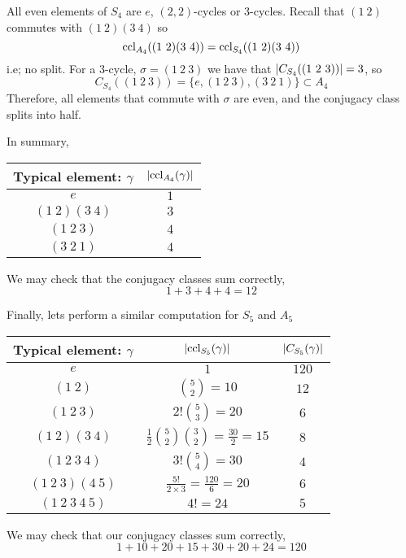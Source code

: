 \documentclass{article}
\begin{document}
\begin{eg}
    All even elements of $S_4$ are $e$, $(2, 2)$-cycles or $3$-cycles.
    Recall that $(1\ 2)$ commutes with $(1\ 2)(3\ 4)$ so
    \[
        \operatorname{ccl}_{A_4}((1\ 2)(3\ 4)) = \operatorname{ccl}_{S_4}((1\ 2)(3\ 4))  
    \]
    i.e; no split. For a $3$-cycle, $\sigma = (1\ 2\ 3)$ we have that $\left\lvert C_{S_4}((1\ 2\ 3))\right\rvert = 3$, so
    \[
        C_{S_4}((1\ 2\ 3)) = \{e, (1\ 2\ 3), (3\ 2\ 1)\} \subset A_4
    \]
    Therefore, all elements that commute with $\sigma$ are even, and the conjugacy class splits into half.

    In summary,
    \begin{center}
    \begin{tabular}{c | c}
        Typical element: $\gamma$ & $\left\lvert \operatorname{ccl}_{A_4}(\gamma)\right\rvert$ \\
        \hline
        $e$ & $1$ \\
        $(1\ 2)(3\ 4)$ & $3$ \\
        $(1\ 2\ 3)$ & $4$ \\
        $(3\ 2\ 1)$ & $4$
    \end{tabular}
    \end{center}
    We may check that the conjugacy classes sum correctly,
    \[
        1 + 3 + 4 + 4 = 12
    \]
\end{eg}

Finally, lets perform a similar computation for $S_5$ and $A_5$
\begin{eg}[Conjugacy in $S_5$]
    \begin{center}
    \begin{tabular}{c | c | c}
        Typical element: $\gamma$ & $\left\lvert \operatorname{ccl}_{S_5}(\gamma)\right\rvert$ & $\left\lvert C_{S_5}(\gamma)\right\rvert$ \\
        \hline
        $e$ & $1$ & $120$ \\[10pt]
        $(1\ 2)$ & $\binom{5}{2} = 10$ & $12$ \\[10pt]
        $(1\ 2\ 3)$ & $2! \binom{5}{3} = 20$ & $6$ \\[10pt]
        $(1\ 2)(3\ 4)$ & $\frac{1}{2} \binom{5}{2} \binom{3}{2} = \frac{30}{2} = 15$ & $8$ \\[10pt]
        $(1\ 2\ 3\ 4)$ & $3! \binom{5}{4} = 30$ & $4$ \\[10pt]
        $(1\ 2\ 3)(4\ 5)$ & $\frac{5!}{2 \times 3} = \frac{120}{6} = 20$ & $6$ \\[10pt]
        $(1\ 2\ 3\ 4\ 5)$ & $ 4! = 24 $ & $5$
    \end{tabular}
    \end{center}
    We may check that our conjugacy classes sum correctly,
    \[
        1 + 10 + 20 + 15 + 30 + 20 + 24 = 120
    \]
\end{eg}
\end{document}
